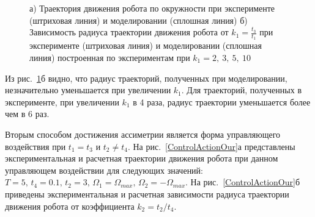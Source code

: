 \begin{figure}[!ht]
	\begin{minipage}[h]{0.25\linewidth}
	\end{minipage}
	\hfill
	\begin{minipage}[h]{0.6\linewidth}
	\end{minipage}
	\caption{а) Траектория движения робота по окружности при эксперименте (штриховая линия) и моделировании (сплошная линия)  б) Зависимость радиуса траектории движения робота от $k_1 = \frac{t_3}{t_1}$ при эксперименте (штриховая линия) и моделировании (сплошная линия) построенная по экспериментам при $k_1 = 2,\ 3,\ 5,\ 10$ }
	\label{CircleTrajectory}
\end{figure}


Из рис.~\ref{CircleTrajectory}б видно, что радиус траекторий, полученных при моделировании, незначительно уменьшается при увеличении $k_1$. Для траекторий, полученных в эксперименте, при увеличении $k_1$ в 4 раза, радиус траектории уменьшается более чем в 6 раз.

Вторым способом достижения ассиметрии является форма управляющего воздействия при $t_1 = t_3$ и $t_2 \neq t_4$. На рис.~\ref{ControlActionOur}а представлены экспериментальная и расчетная траектории движения робота при данном управляющем воздействии для следующих значений: $ T=5,\, t_4 = 0.1,\, t_2 = 3,\, \Omega_1 = \Omega_{max},\, \Omega_2 = -\Omega_{max} $. На рис.~\ref{ControlActionOur}б приведены экспериментальная и расчетная зависимости радиуса траектории движения робота от коэффициента $k_2 = t_2 / t_4$. 


